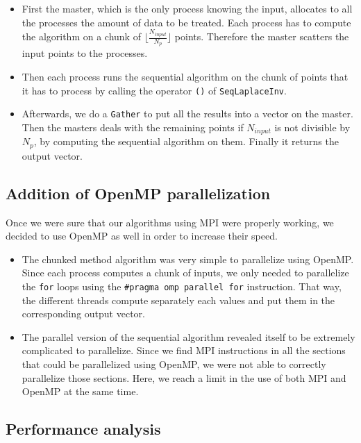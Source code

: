 \documentclass[11pt,a4paper]{article}
\begin{document}
\begin{itemize}

\item First the master, which is the only process knowing the input, allocates to all the processes the amount of data to be treated. Each process has to compute the algorithm on a chunk of $\lfloor \frac{N_{input}}{N_p} \rfloor$ points. Therefore the master scatters the input points to the processes. 

\item Then each process runs the sequential algorithm on the chunk of points that it has to process by calling the operator \verb_()_ of \verb_SeqLaplaceInv_. 

\item Afterwards, we do a \verb_Gather_ to put all the results into a vector on the master. Then the masters deals with the remaining points if $N_{input}$ is not divisible by $N_p$, by computing the sequential algorithm on them. Finally it returns the output vector. 

\end{itemize}

\subsection{Addition of OpenMP parallelization}
Once we were sure that our algorithms using MPI were properly working, we decided to use OpenMP as well in order to increase their speed. 

\begin{itemize}

\item The chunked method algorithm was very simple to parallelize using OpenMP. Since each process computes a chunk of inputs, we only needed to parallelize the \verb_for_ loops using the \verb_#pragma omp parallel for_ instruction. That way, the different threads compute separately each values and put them in the corresponding output vector.

\item The parallel version of the sequential algorithm revealed itself to be extremely complicated to parallelize. Since we find MPI instructions in all the sections that could be parallelized using OpenMP, we were not able to correctly parallelize those sections. Here, we reach a limit in the use of both MPI and OpenMP at the same time.

\end{itemize}

\subsection{Performance analysis}
\end{document}
